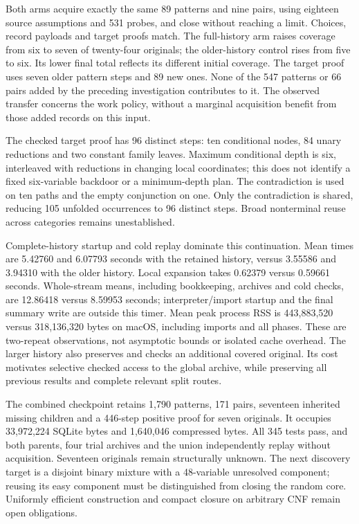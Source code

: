 \documentclass[11pt,a4paper]{article}
\numberwithin{equation}{section}
\theoremstyle{plain}
\theoremstyle{definition}
\theoremstyle{remark}
\begin{document}
Both arms acquire exactly the same 89 patterns and nine pairs, using eighteen
source assumptions and 531 probes, and close without reaching a limit. Choices,
record payloads and target proofs match. The full-history arm raises coverage
from six to seven of twenty-four originals; the older-history control rises from
five to six. Its lower final total reflects its different initial coverage.
The target proof uses seven older pattern steps and 89 new ones. None of the
547 patterns or 66 pairs added by the preceding investigation contributes to it.
The observed transfer concerns the work policy, without a marginal acquisition
benefit from those added records on this input.

The checked target proof has 96 distinct steps: ten conditional nodes, 84 unary
reductions and two constant family leaves. Maximum conditional depth is six,
interleaved with reductions in changing local coordinates; this does not identify
a fixed six-variable backdoor or a minimum-depth plan. The contradiction is used
on ten paths and the empty conjunction on one. Only the contradiction is shared,
reducing 105 unfolded occurrences to 96 distinct steps. Broad nonterminal reuse
across categories remains unestablished.

Complete-history startup and cold replay dominate this continuation. Mean times
are 5.42760 and 6.07793 seconds with the retained history, versus 3.55586 and
3.94310 with the older history. Local expansion takes 0.62379 versus 0.59661
seconds. Whole-stream means, including bookkeeping, archives and cold checks,
are 12.86418 versus 8.59953 seconds; interpreter/import startup and the final
summary write are outside this timer. Mean peak process RSS is 443,883,520 versus
318,136,320 bytes on macOS, including imports and all phases. These are two-repeat
observations, not asymptotic bounds or isolated cache overhead. The larger
history also preserves and checks an additional covered original. Its cost
motivates selective checked access to the global archive, while preserving all
previous results and complete relevant split routes.

The combined checkpoint retains 1,790 patterns, 171 pairs, seventeen inherited
missing children and a 446-step positive proof for seven originals. It occupies
33,972,224 SQLite bytes and 1,640,046 compressed bytes. All 345 tests pass, and
both parents, four trial archives and the union independently replay without
acquisition. Seventeen originals remain structurally unknown. The next discovery
target is a disjoint binary mixture with a 48-variable unresolved component;
reusing its easy component must be distinguished from closing the random core.
Uniformly efficient construction and compact closure on arbitrary CNF remain
open obligations.
\end{document}
